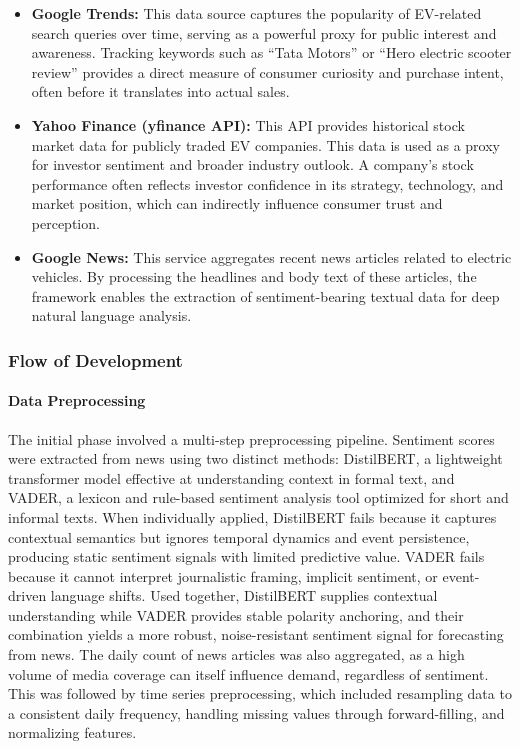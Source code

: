 \documentclass[pdflatex,sn-mathphys-num]{sn-jnl}%
\begin{document}
\begin{itemize}
    \item \textbf{Google Trends:} This data source captures the popularity of EV-related search queries over time, serving as a powerful proxy for public interest and awareness. Tracking keywords such as ``Tata Motors'' or ``Hero electric scooter review'' provides a direct measure of consumer curiosity and purchase intent, often before it translates into actual sales.

    \item \textbf{Yahoo Finance (yfinance API):} This API provides historical stock market data for publicly traded EV companies. This data is used as a proxy for investor sentiment and broader industry outlook. A company's stock performance often reflects investor confidence in its strategy, technology, and market position, which can indirectly influence consumer trust and perception.

    \item \textbf{Google News:} This service aggregates recent news articles related to electric vehicles. By processing the headlines and body text of these articles, the framework enables the extraction of sentiment-bearing textual data for deep natural language analysis.
\end{itemize}

\subsubsection{Flow of Development}
\paragraph{Data Preprocessing}
The initial phase involved a multi-step preprocessing pipeline. Sentiment scores were extracted from news using two distinct methods: DistilBERT, a lightweight transformer model effective at understanding context in formal text, and VADER, a lexicon and rule-based sentiment analysis tool optimized for short and informal texts. When individually applied, DistilBERT fails because it captures contextual semantics but ignores temporal dynamics and event persistence, producing static sentiment signals with limited predictive value. VADER fails because it cannot interpret journalistic framing, implicit sentiment, or event-driven language shifts. Used together, DistilBERT supplies contextual understanding while VADER provides stable polarity anchoring, and their combination yields a more robust, noise-resistant sentiment signal for forecasting from news. The daily count of news articles was also aggregated, as a high volume of media coverage can itself influence demand, regardless of sentiment. This was followed by time series preprocessing, which included resampling data to a consistent daily frequency, handling missing values through forward-filling, and normalizing features.
\end{document}
